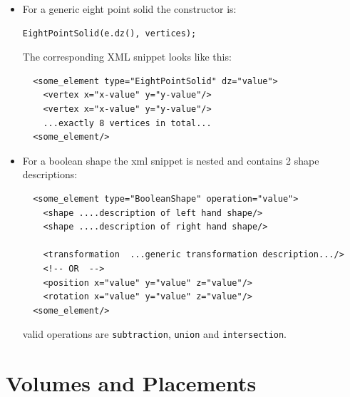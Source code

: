 \begin{itemize}
\item For a generic eight point solid the constructor is:
\begin{verbatim}
EightPointSolid(e.dz(), vertices);
\end{verbatim}
The corresponding XML snippet looks like this:
\begin{verbatim}
  <some_element type="EightPointSolid" dz="value">
    <vertex x="x-value" y="y-value"/>
    <vertex x="x-value" y="y-value"/>
    ...exactly 8 vertices in total...
  <some_element/>
\end{verbatim}

\item For a boolean shape the xml snippet is nested and contains 2 shape descriptions:
\begin{verbatim}
  <some_element type="BooleanShape" operation="value">
    <shape ....description of left hand shape/>
    <shape ....description of right hand shape/>

    <transformation  ...generic transformation description.../>
    <!-- OR  -->
    <position x="value" y="value" z="value"/>
    <rotation x="value" y="value" z="value"/>
  <some_element/>
\end{verbatim}
valid operations are \texttt{subtraction}, \texttt{union} and \texttt{intersection}.

\end{itemize}

\section{Volumes and Placements}

